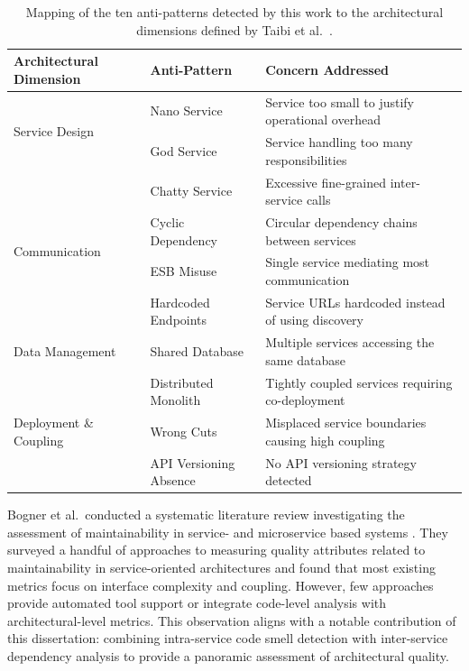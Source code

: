 \begin{table}[htbp]
    \begin{center}
        \small
        \begin{tabular}{|l|l|p{170pt}|}
            \hline
            \textbf{Architectural Dimension} & \textbf{Anti-Pattern} & \textbf{Concern Addressed} \\
            \hline\hline
            \multirow{2}{*}{Service Design}
            & Nano Service   & Service too small to justify operational overhead \\
            \cline{2-3}
            & God Service    & Service handling too many responsibilities \\
            \hline
            \multirow{4}{*}{Communication}
            & Chatty Service       & Excessive fine-grained inter-service calls \\
            \cline{2-3}
            & Cyclic Dependency    & Circular dependency chains between services \\
            \cline{2-3}
            & ESB Misuse           & Single service mediating most communication \\
            \cline{2-3}
            & Hardcoded Endpoints  & Service URLs hardcoded instead of using discovery \\
            \hline
            Data Management
            & Shared Database      & Multiple services accessing the same database \\
            \hline
            \multirow{3}{*}{Deployment \& Coupling}
            & Distributed Monolith    & Tightly coupled services requiring co-deployment \\
            \cline{2-3}
            & Wrong Cuts              & Misplaced service boundaries causing high coupling \\
            \cline{2-3}
            & API Versioning Absence  & No API versioning strategy detected \\
            \hline
        \end{tabular}
    \end{center}
    \caption{Mapping of the ten anti-patterns detected by this work to the architectural dimensions defined by Taibi et al.\ \cite{Taibi2020}.}
    \label{tab:antipattern-dimensions}
\end{table}

Bogner et al.\ conducted a systematic literature review investigating the assessment of maintainability in service- and microservice based systems \cite{Bogner2019}. They surveyed a handful of approaches to measuring quality attributes related to maintainability in service-oriented architectures and found that most existing metrics focus on interface complexity and coupling. However, few approaches provide automated tool support or integrate code-level analysis with architectural-level metrics. This observation aligns with a notable contribution of this dissertation: combining intra-service code smell detection with inter-service dependency analysis to provide a panoramic assessment of architectural quality.

